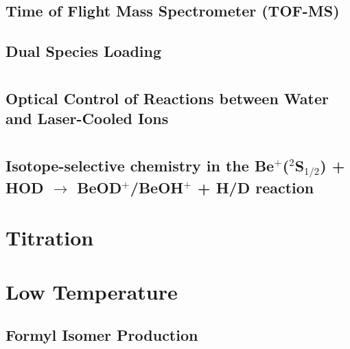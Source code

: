 \documentclass [PhD,nolistoftables,scheader] {uclathes}
\begin{document}
	\section{Time of Flight Mass Spectrometer (TOF-MS)}
	
	
	\section{Dual Species Loading}
	

\chapter{}
	\section{Optical Control of Reactions between Water and Laser-Cooled  Ions}\label{sec: Be+H2O}
	

\chapter{}
	\section{Isotope-selective chemistry in the Be$^+$($^2$S$_{1/2}$) + HOD $\rightarrow$ BeOD$^+$/BeOH$^+$ + H/D reaction}
	

\chapter{ Titration}
	\section{}
	
	
	\section{}
	

\chapter{Low Temperature }
	\section{Formyl Isomer Production} \label{sec: [HCO]}
	
\end{document}

